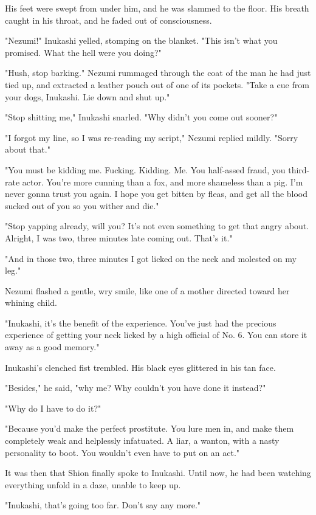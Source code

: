 His feet were swept from under him, and he was slammed to the floor. His
breath caught in his throat, and he faded out of consciousness.

\mybreak

"Nezumi!" Inukashi yelled, stomping on the blanket. "This isn't what you
promised. What the hell were you doing?"

"Hush, stop barking." Nezumi rummaged through the coat of the man he had
just tied up, and extracted a leather pouch out of one of its pockets.
"Take a cue from your dogs, Inukashi. Lie down and shut up."

"Stop shitting me," Inukashi snarled. "Why didn't you come out sooner?"

"I forgot my line, so I was re-reading my script," Nezumi replied
mildly. "Sorry about that."

"You must be kidding me. Fucking. Kidding. Me. You half-assed fraud, you
third-rate actor. You're more cunning than a fox, and more shameless
than a pig. I'm never gonna trust you again. I hope you get bitten by
fleas, and get all the blood sucked out of you so you wither and die."

"Stop yapping already, will you? It's not even something to get that
angry about. Alright, I was two, three minutes late coming out. That's
it."

"And in those two, three minutes I got licked on the neck and molested
on my leg."

Nezumi flashed a gentle, wry smile, like one of a mother directed toward
her whining child.

"Inukashi, it's the benefit of the experience. You've just had the
precious experience of getting your neck licked by a high official of
No. 6. You can store it away as a good memory."

Inukashi's clenched fist trembled. His black eyes glittered in his tan
face.

"Besides," he said, "why me? Why couldn't you have done it instead?"

"Why do I have to do it?"

"Because you'd make the perfect prostitute. You lure men in, and make
them completely weak and helplessly infatuated. A liar, a wanton, with a
nasty personality to boot. You wouldn't even have to put on an act."

It was then that Shion finally spoke to Inukashi. Until now, he had been
watching everything unfold in a daze, unable to keep up.

"Inukashi, that's going too far. Don't say any more."

